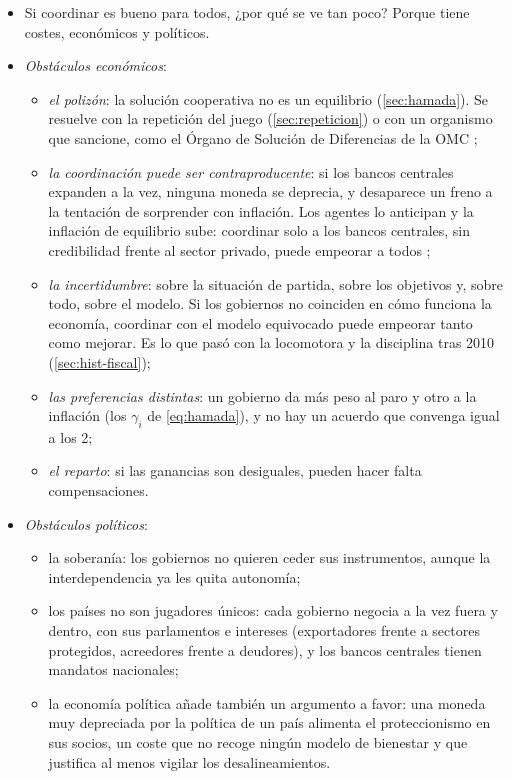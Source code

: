 \documentclass[11pt]{article}
\begin{document}
\begin{itemize}
\item Si coordinar es bueno para todos, ¿por qué se ve tan poco? Porque tiene costes, económicos y políticos.
\item \emph{Obstáculos económicos}:
  \begin{itemize}
  \item \emph{el polizón}: la solución cooperativa no es un equilibrio (\ref{sec:hamada}). Se resuelve con la repetición del juego (\ref{sec:repeticion}) o con un organismo que sancione, como el Órgano de Solución de Diferencias de la OMC ;
  \item \emph{la coordinación puede ser contraproducente}: si los bancos centrales expanden a la vez, ninguna moneda se deprecia, y desaparece un freno a la tentación de sorprender con inflación. Los agentes lo anticipan y la inflación de equilibrio sube: coordinar solo a los bancos centrales, sin credibilidad frente al sector privado, puede empeorar a todos\nocite{Rogoff1985Counterproductive} ;
  \item \emph{la incertidumbre}: sobre la situación de partida, sobre los objetivos y, sobre todo, sobre el modelo. Si los gobiernos no coinciden en cómo funciona la economía, coordinar con el modelo equivocado puede empeorar tanto como mejorar\nocite{FrankelRockett1988}. Es lo que pasó con la locomotora y la disciplina tras 2010 (\ref{sec:hist-fiscal});
  \item \emph{las preferencias distintas}: un gobierno da más peso al paro y otro a la inflación (los $\gamma_i$ de \eqref{eq:hamada}), y no hay un acuerdo que convenga igual a los 2;
  \item \emph{el reparto}: si las ganancias son desiguales, pueden hacer falta compensaciones.
  \end{itemize}
\item \emph{Obstáculos políticos}:
  \begin{itemize}
  \item la soberanía: los gobiernos no quieren ceder sus instrumentos, aunque la interdependencia ya les quita autonomía;
  \item los países no son jugadores únicos: cada gobierno negocia a la vez fuera y dentro, con sus parlamentos e intereses (exportadores frente a sectores protegidos, acreedores frente a deudores)\nocite{Putnam1988Diplomacy}, y los bancos centrales tienen mandatos nacionales\nocite{Rey2013Dilema};
  \item la economía política añade también un argumento a favor: una moneda muy depreciada por la política de un país alimenta el proteccionismo en sus socios, un coste que no recoge ningún modelo de bienestar y que justifica al menos vigilar los desalineamientos\nocite{BrozFrieden2013}.
  \end{itemize}
\end{itemize}
\end{document}
